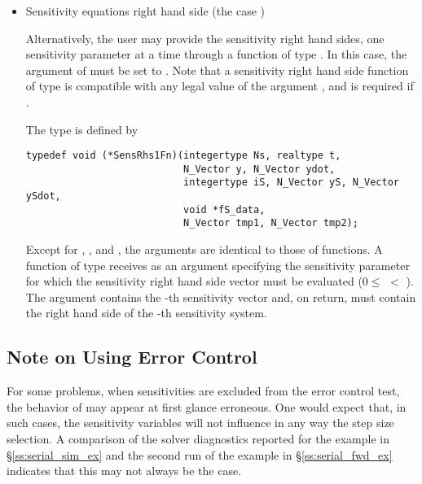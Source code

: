 \begin{itemize}
\item Sensitivity equations right hand side (the case )
  
  Alternatively, the user may provide the sensitivity right hand sides, one sensitivity
  parameter at a time through a function of type . 
  In this case, the argument  of  must be set to . 
  Note that a sensitivity right hand side function of type  is compatible with
  any legal value of the  argument , and is 
  required if .

  The type  is defined by
\begin{verbatim}
typedef void (*SensRhs1Fn)(integertype Ns, realtype t, 
                           N_Vector y, N_Vector ydot, 
                           integertype iS, N_Vector yS, N_Vector ySdot, 
                           void *fS_data,
                           N_Vector tmp1, N_Vector tmp2);
\end{verbatim}
  Except for , , and , the arguments are identical to those of 
   functions.
  A function of type  receives as an argument  specifying the
  sensitivity parameter for which the sensitivity right hand side vector must be
  evaluated ($0 \le$  $<$ ). The argument  contains the -th
  sensitivity vector and, on return,  must contain the right hand side of the
  -th sensitivity system.


%
\end{itemize}

\subsection{Note on Using  Error Control}\label{ss:partial}
For some problems, when sensitivities are excluded from the error control test, 
the behavior of {\cvodes} may appear at first glance erroneous. One would
expect that, in such cases, the sensitivity variables will not influence in
any way the step size selection. A comparison of the solver diagnostics 
reported for the  example in \S\ref{ss:serial_sim_ex} and the
second run of the  example in \S\ref{ss:serial_fwd_ex} indicates 
that this may not always be the case.

